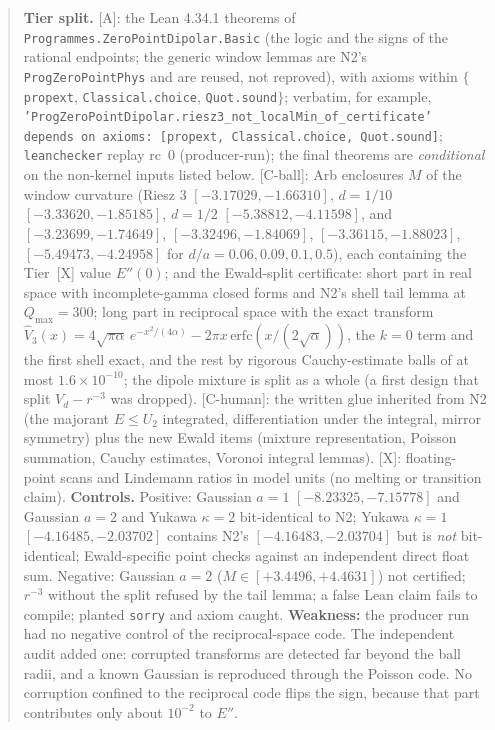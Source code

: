 \documentclass[11pt]{article}
\newcommand{\tier}[1]{\textsf{[#1]}}
\newcommand{\tA}{\tier{A}}
\newcommand{\tCb}{\tier{C-ball}}
\newcommand{\tCh}{\tier{C-human}}
\newcommand{\tX}{\tier{X}}
\newcommand{\lean}[1]{\texttt{#1}}
\begin{document}
\begin{abstract}
\textbf{Tier split.}
\tA: the Lean 4.34.1 theorems of \lean{Programmes.ZeroPointDipolar.Basic} (the logic and the signs of the rational endpoints; the generic window lemmas are N2's \lean{ProgZeroPointPhys} and are reused, not reproved), with axioms within $\{$\lean{propext}, \lean{Classical.choice}, \lean{Quot.sound}$\}$; verbatim, for example,
\lean{'ProgZeroPointDipolar.riesz3\_not\_localMin\_of\_certificate' depends on axioms: [propext, Classical.choice, Quot.sound]}; \texttt{leanchecker} replay rc~0 (producer-run); the final theorems are \emph{conditional} on the non-kernel inputs listed below.
\tCb: Arb enclosures $M$ of the window curvature (Riesz 3 $[-3.17029,-1.66310]$, $d=1/10$ $[-3.33620,-1.85185]$, $d=1/2$ $[-5.38812,-4.11598]$, and $[-3.23699,-1.74649]$, $[-3.32496,-1.84069]$, $[-3.36115,-1.88023]$, $[-5.49473,-4.24958]$ for $d/a=0.06,0.09,0.1,0.5$), each containing the Tier~\tX{} value $E''(0)$;
and the Ewald-split certificate: short part in real space with incomplete-gamma closed forms and N2's shell tail lemma at $Q_{\max}=300$; long part in reciprocal space with the exact transform $\hat V_3(x)=4\sqrt{\pi\alpha}\,e^{-x^2/(4\alpha)}-2\pi x\,\mathrm{erfc}(x/(2\sqrt\alpha))$, the $k=0$ term and the first shell exact, and the rest by rigorous Cauchy-estimate balls of at most $1.6\times10^{-10}$; the dipole mixture is split as a whole (a first design that split $V_d-r^{-3}$ was dropped).
\tCh: the written glue inherited from N2 (the majorant $E\le U_2$ integrated, differentiation under the integral, mirror symmetry) plus the new Ewald items (mixture representation, Poisson summation, Cauchy estimates, Voronoi integral lemmas).
\tX: floating-point scans and Lindemann ratios in model units (no melting or transition claim).
\textbf{Controls.} Positive: Gaussian $a=1$ $[-8.23325,-7.15778]$ and Gaussian $a=2$ and Yukawa $\kappa=2$ bit-identical to N2; Yukawa $\kappa=1$ $[-4.16485,-2.03702]$ contains N2's $[-4.16483,-2.03704]$ but is \emph{not} bit-identical; Ewald-specific point checks against an independent direct float sum. Negative: Gaussian $a=2$ ($M\in[+3.4496,+4.4631]$) not certified; $r^{-3}$ without the split refused by the tail lemma; a false Lean claim fails to compile; planted \lean{sorry} and axiom caught. \textbf{Weakness:} the producer run had no negative control of the reciprocal-space code. The independent audit added one: corrupted transforms are detected far beyond the ball radii, and a known Gaussian is reproduced through the Poisson code. No corruption confined to the reciprocal code flips the sign, because that part contributes only about $10^{-2}$ to $E''$.
\end{abstract}
\end{document}
